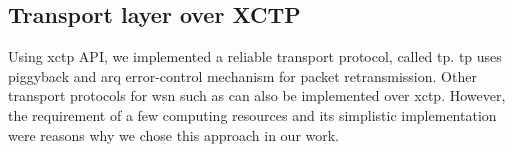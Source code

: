 
\subsection{Transport layer over XCTP}
\label{sec:transport-layer-over-xctp}

Using \ac{xctp} API, we implemented a reliable transport protocol, called \ac{tp}. \ac{tp} uses piggyback and \ac{arq} error-control mechanism for packet retransmission. Other transport protocols for \ac{wsn} such as \cite{RCRT, flush, STCP} can also be implemented over \ac{xctp}. However, the requirement of a few computing resources and its simplistic implementation were reasons why we chose this approach in our work.
